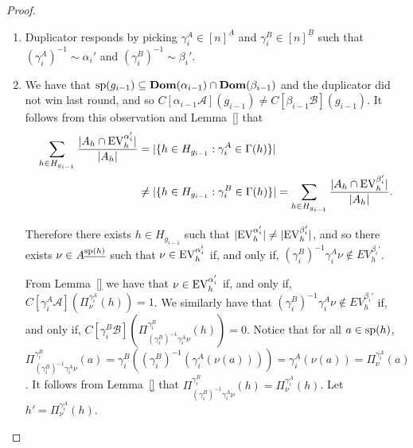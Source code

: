 \documentclass[../main/thesis.tex]{subfiles}
\begin{document}
\begin{proof}
\begin{enumerate}

    



    
  \item Duplicator responds by picking $\gamma^{A}_{i} \in [n]^{\underline{A}}$
    and $\gamma^B_{i} \in [n]^{\underline{B}}$ such that $(\gamma^A_i)^{-1} \sim
    \alpha_i'$ and $(\gamma^B_i)^{-1} \sim \beta_i'$.

  \item We have that $\text{sp}(g_{i-1}) \subseteq \text{\textbf{Dom}}(\alpha_{i-1}) \cap
    \text{\textbf{Dom}}(\beta_{i-1})$ and the duplicator did not win last round, and so
    $C[\alpha_{i-1} \mathcal{A}](g_{i-1}) \neq C[\beta_{i-1}
    \mathcal{B}](g_{i-1})$. It follows from this observation and Lemma~\ref{}
    that
    \begin{align*}
      \sum_{h \in H_{g_{i-1}}} \frac{\vert A_h \cap \text{EV}^{\alpha_{i}'}_h \vert}{\vert A_h \vert} &= \vert \{ h \in H_{g_{i-1}} : \gamma^A_i \in \Gamma(h)\} \vert \\ &\neq \vert \{h \in H_{g_{i-1}} : \gamma^B_i \in \Gamma(h)\} \vert = \sum_{h \in H_{g_{i-1}}}\frac{\vert A_h \cap \text{EV}^{\beta_{i}'}_h \vert}{\vert A_h \vert}.
    \end{align*}

    Therefore there exists $h \in H_{g_{i-1}}$ such that $\vert
    \text{EV}^{\alpha_{i}'}_h \vert \neq \vert \text{EV}^{\beta_{i}'}_h \vert$, and so there
    exists $\nu \in A^{\underline{\text{sp}(h)}}$ such that $\nu \in
    \text{EV}^{\alpha_{i}'}_h$ if, and only if, $(\gamma^B_{i})^{-1} \gamma^A_{i} \nu
    \not\in EV^{\beta_{i}'}_h$.

    From Lemma~\ref{} we have that $\nu \in \text{EV}^{\alpha_{i}'}_h$ if, and only
    if, $C[\gamma^A_i \mathcal{A}] (\Pi^{\gamma^A_i}_{\nu} (h)) = 1$. We
    similarly have that $(\gamma^B_{i})^{-1} \gamma^A_{i} \nu \not\in
    EV^{\beta_{i}'}_h$ if, and only if, $C[\gamma^B_i \mathcal{B}]
    (\Pi^{\gamma^B_i}_{(\gamma^B_i)^{-1} \gamma^A_{i} \nu} (h)) = 0$. Notice
    that for all $a \in \text{sp}(h)$, $\Pi^{\gamma^B_i}_{(\gamma^B_i)^{-1}
      \gamma^A_{i} \nu} (a) = \gamma^B_i ((\gamma^B_i)^{-1} (\gamma^A_i (\nu
    (a)))) = \gamma^A_i (\nu (a)) = \Pi^{\gamma^A_i}_{\nu}(a)$. It follows from
    Lemma~\ref{} that $\Pi^{\gamma^B_i}_{(\gamma^B_i)^{-1} \gamma^A_{i} \nu} (h)
    = \Pi^{\gamma^A_i}_{\nu} (h)$. Let $h' = \Pi^{\gamma^A_i}_{\nu} (h)$.


\end{enumerate}
\end{proof}
\end{document}
